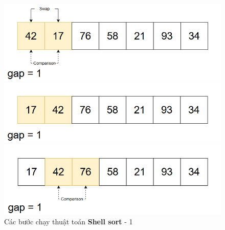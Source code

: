 \begin{figure}[H]
    \includegraphics[width=0.5\linewidth]{img/shell_sort/6.png}
    \vspace{0.15cm}

    \includegraphics[width=0.5\linewidth]{img/shell_sort/7.png}
    \vspace{0.15cm}

    \includegraphics[width=0.5\linewidth]{img/shell_sort/8.png}
    \vspace{0.15cm}
    \caption{Các bước chạy thuật toán \textbf{Shell sort} - 1}
\end{figure}


